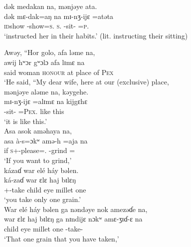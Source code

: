 \medskip
 dək  medakan  na,  mənjəye  ata.\\
\gll dək    mɛ-dak=aŋ            na        mɪ-nʒ-ijɛ     =atəta\\ 
\textsc{id}show   {\NOM}-show=\textsc{s}.{\IO}   \textsc{s}.{\DO}   {\NOM}{}-sit-{\CL}   =\textsc{p}.{\POSS}\\
\glt ‘instructed her in their habits.’ (lit. instructing their sitting)
\z

\ea  Awəy, “Hor  golo,  afa  ləme  na,\\
\gll awij    hʷɔr gʷɔlɔ afa      lɪmɛ    na\\
said   woman  \textsc{honour}  {at place of}    \textsc{Pex}     {\PSP}\\
\glt ‘He said, “My dear wife, here at our (exclusive) place,\\

\clearpage
\medskip
 mənjəye  aləme  na,  kəygehe.\\
\gll mɪ-nʒ-ijɛ    =alɪmɛ     na  kijgɛhɛ\\
{\NOM}{}-sit-{\CL}   =\textsc{Pex}.{\POSS}    {\PSP}  {like this}\\
\glt ‘it is like this.’\\

\medskip
 Asa  asok  aməhaya  na,\\
\gll asa   à-s=ɔkʷ amə-h    =aja na\\
if     \textsc{s}+{\PFV}-please={\twoS}.{\IO}  {\DEP}-grind  ={\PLU}   {\PSP}\\
\glt ‘If you want to grind,’\\

\medskip
 kázaɗ  war  elé  háy  bəlen.\\
\gll ká{}-zaɗ  war     ɛlɛ      haj       bɪlɛŋ\\
{\twoS}+{\IFV}-take  child  eye  millet  one\\
\glt ‘you take only one grain.’\\

\medskip
 War  elé  háy  bəlen  ga  nəndəye  nok  amezəɗe  na,\\
\gll war    ɛlɛ      haj     bɪlɛŋ  ga   nɪndijɛ  nɔkʷ amɛ-ʒɪɗ-ɛ na\\
child     eye  millet  one      {\ADJ}  {\DEM}    {\twoS}    {\DEP}-take-{\CL}      {\PSP}\\
\glt ‘That one grain that you have taken,’\\

